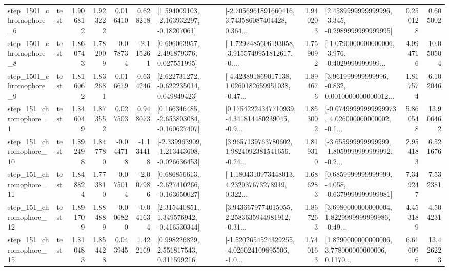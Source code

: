 \begin{tabular}{llrrrrllrlrr}
  step\_1501\_chromophore\_6 &      test &      1.906812 &    1.923222 &      0.016410 &  0.628218 &    [1.594009103, -2.163932297, -0.18207061] &  [-2.7056961891660416, 3.743586087404428, 0.364... &       1.940203 &  [2.4589999999999996, -3.345, -0.2989999999999995] &            0.250128 &          0.605002 \\
  step\_1501\_chromophore\_8 &      test &      1.860743 &    1.782009 &     -0.078734 & -2.115261 &     [0.696063957, 2.491879376, 0.027551995] &  [-1.7292485606193058, -3.9155749951812617, -0.... &       1.759092 &  [-1.0790000000000006, -3.976, -0.4029999999999... &            4.994716 &         10.050504 \\
  step\_1501\_chromophore\_9 &      test &      1.816062 &    1.832681 &      0.016619 &  0.634246 &    [2.622731272, -0.622235014, 0.049849423] &  [-4.423891869017138, 1.0260182659951038, -0.47... &       1.894676 &  [3.961999999999996, -0.832, 0.0010000000000012... &            1.817574 &          6.102046 \\
   step\_151\_chromophore\_1 &      test &      1.846049 &    1.873552 &      0.027503 &  0.948073 &   [0.166346485, -2.653803084, -0.160627407] &  [0.17542224347710939, -4.341814480239045, -0.9... &       1.853002 &  [-0.07499999999999973, 4.026000000000002, -0.1... &            5.860548 &         13.906462 \\
  step\_151\_chromophore\_10 &      test &      1.892498 &    1.847780 &     -0.044718 & -1.134418 &  [-2.339963909, -1.213443608, -0.026636453] &  [3.9657139763780602, 1.9824092381541656, -0.24... &       1.819310 &  [-3.655999999999999, -1.8059999999999992, -0.2... &            2.954183 &          6.521676 \\
  step\_151\_chromophore\_11 &      test &      1.848824 &    1.773810 &     -0.075014 & -2.007986 &   [0.686856613, -2.627410266, -0.163650027] &  [-1.1804310973448013, 4.232037673278919, 0.322... &       1.686283 &  [0.6859999999999999, -4.058, -0.6379999999999981] &            7.349247 &          7.532381 \\
  step\_151\_chromophore\_12 &      test &      1.891709 &    1.884889 &     -0.006820 & -0.041634 &    [2.315440851, 1.349576942, -0.416530344] &  [3.9436679774015055, 2.2583635944981912, -0.31... &       1.867263 &  [3.6980000000000004, 1.8229999999999986, -0.49... &            4.453189 &          4.504231 \\
  step\_151\_chromophore\_15 &      test &      1.810483 &    1.854428 &      0.043945 &  1.422169 &     [0.998226829, 2.551817543, 0.311599216] &  [-1.5202654524329255, -4.026024109895506, -1.0... &       1.740163 &  [1.8290000000000006, 3.778000000000006, 0.1170... &            6.616096 &         13.426223 \\

\end{tabular}
